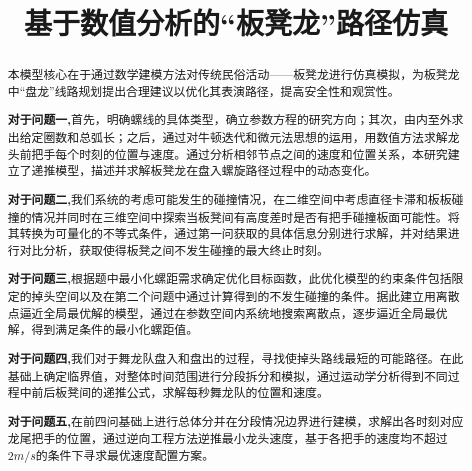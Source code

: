 \documentclass[withoutpreface,bwprint]{cumcmthesis}
\title{基于数值分析的“板凳龙”路径仿真\\}  %
\begin{document}
\maketitle
\begin{abstract}
	本模型核心在于通过数学建模方法对传统民俗活动——板凳龙进行仿真模拟，为板凳龙中“盘龙”线路规划提出合理建议以优化其表演路径，提高安全性和观赏性。
	
	\textbf{对于问题一,}首先，明确螺线的具体类型，确立参数方程的研究方向；其次，由内至外求出给定圈数和总弧长；之后，通过对牛顿迭代和微元法思想的运用，用数值方法求解龙头前把手每个时刻的位置与速度。通过分析相邻节点之间的速度和位置关系，本研究建立了递推模型，描述并求解板凳龙在盘入螺旋路径过程中的动态变化。
	
	\textbf{对于问题二,}我们系统的考虑可能发生的碰撞情况，在二维空间中考虑直径卡滞和板板碰撞的情况并同时在三维空间中探索当板凳间有高度差时是否有把手碰撞板面可能性。将其转换为可量化的不等式条件，通过第一问获取的具体信息分别进行求解，并对结果进行对比分析，获取使得板凳之间不发生碰撞的最大终止时刻。
	
	\textbf{对于问题三,}根据题中最小化螺距需求确定优化目标函数，此优化模型的约束条件包括限定的掉头空间以及在第二个问题中通过计算得到的不发生碰撞的条件。据此建立用离散点逼近全局最优解的模型，通过在参数空间内系统地搜索离散点，逐步逼近全局最优解，得到满足条件的最小化螺距值。
	
	\textbf{对于问题四,}我们对于舞龙队盘入和盘出的过程，寻找使掉头路线最短的可能路径。在此基础上确定临界值，对整体时间范围进行分段拆分和模拟，通过运动学分析得到不同过程中前后板凳间的递推公式，求解每秒舞龙队的位置和速度。
	
	\textbf{对于问题五,}在前四问基础上进行总体分并在分段情况边界进行建模，求解出各时刻对应龙尾把手的位置，通过逆向工程方法逆推最小龙头速度，基于各把手的速度均不超过$2m/s$的条件下寻求最优速度配置方案。

	

	
	

\end{abstract}
\end{document}
